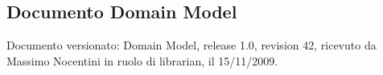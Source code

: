 \subsection{Documento Domain Model}
Documento versionato: Domain Model, release 1.0, revision 42, ricevuto da
Massimo Nocentini in ruolo di librarian, il 15/11/2009.